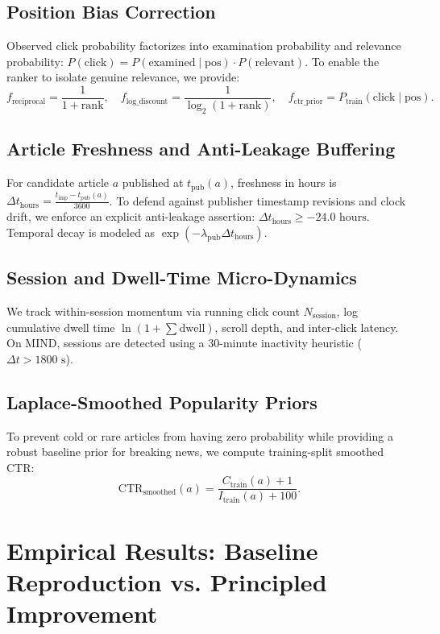 \documentclass[11pt,a4paper]{article}
\begin{document}
\subsection{Position Bias Correction}
Observed click probability factorizes into examination probability and relevance probability: $P(\text{click}) = P(\text{examined} \mid \text{pos}) \cdot P(\text{relevant})$. To enable the ranker to isolate genuine relevance, we provide:
\begin{equation}
f_{\text{reciprocal}} = \frac{1}{1 + \text{rank}}, \quad f_{\text{log\_discount}} = \frac{1}{\log_2(1 + \text{rank})}, \quad f_{\text{ctr\_prior}} = P_{\text{train}}(\text{click} \mid \text{pos}).
\end{equation}

\subsection{Article Freshness and Anti-Leakage Buffering}
For candidate article $a$ published at $t_{\text{pub}}(a)$, freshness in hours is $\Delta t_{\text{hours}} = \frac{t_{\text{imp}} - t_{\text{pub}}(a)}{3600}$. To defend against publisher timestamp revisions and clock drift, we enforce an explicit anti-leakage assertion: $\Delta t_{\text{hours}} \ge -24.0\text{ hours}$. Temporal decay is modeled as $\exp(-\lambda_{\text{pub}} \Delta t_{\text{hours}})$.

\subsection{Session and Dwell-Time Micro-Dynamics}
We track within-session momentum via running click count $N_{\text{session}}$, log cumulative dwell time $\ln(1 + \sum \text{dwell})$, scroll depth, and inter-click latency. On MIND, sessions are detected using a 30-minute inactivity heuristic ($\Delta t > 1800\text{ s}$).

\subsection{Laplace-Smoothed Popularity Priors}
To prevent cold or rare articles from having zero probability while providing a robust baseline prior for breaking news, we compute training-split smoothed CTR:
\begin{equation}
\text{CTR}_{\text{smoothed}}(a) = \frac{C_{\text{train}}(a) + 1}{I_{\text{train}}(a) + 100}.
\end{equation}

\section{Empirical Results: Baseline Reproduction vs. Principled Improvement}
\end{document}
